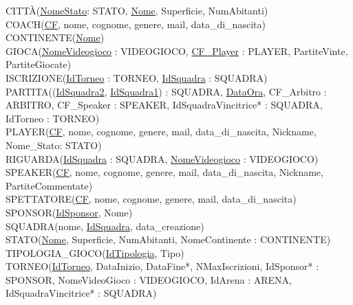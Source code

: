 \documentclass[a4paper,12pt]{report}
\begin{document}
\noindent CITTÀ(\underline{NomeStato}: STATO, \underline{Nome}, Superficie, NumAbitanti) \\

\noindent COACH(\underline{CF}, nome, cognome, genere, mail, data\_di\_nascita) \\

\noindent CONTINENTE(\underline{Nome}) \\

\noindent GIOCA(\underline{NomeVideogioco} : VIDEOGIOCO, \underline{CF\_Player} : PLAYER, PartiteVinte, PartiteGiocate) \\

\noindent ISCRIZIONE(\underline{IdTorneo} : TORNEO, \underline{IdSquadra} : SQUADRA) \\

\noindent PARTITA((\underline{IdSquadra2}, \underline{IdSquadra1}) : SQUADRA, \underline{DataOra}, CF\_Arbitro : ARBITRO, CF\_Speaker : SPEAKER, IdSquadraVincitrice* : SQUADRA, IdTorneo : TORNEO) \\

\noindent PLAYER(\underline{CF}, nome, cognome, genere, mail, data\_di\_nascita, Nickname, Nome\_Stato: STATO) \\

\noindent RIGUARDA(\underline{IdSquadra} : SQUADRA, \underline{NomeVideogioco} : VIDEOGIOCO) \\

\noindent SPEAKER(\underline{CF}, nome, cognome, genere, mail, data\_di\_nascita, Nickname, PartiteCommentate) \\

\noindent SPETTATORE(\underline{CF}, nome, cognome, genere, mail, data\_di\_nascita) \\

\noindent SPONSOR(\underline{IdSponsor}, Nome) \\

\noindent SQUADRA(nome, \underline{IdSquadra}, data\_creazione) \\

\noindent STATO(\underline{Nome}, Superficie, NumAbitanti, NomeContinente : CONTINENTE) \\

\noindent TIPOLOGIA\_GIOCO(\underline{IdTipologia}, Tipo) \\

\noindent TORNEO(\underline{IdTorneo}, DataInizio, DataFine*, NMaxIscrizioni, IdSponsor* : SPONSOR, NomeVideoGioco : VIDEOGIOCO, IdArena : ARENA, IdSquadraVincitrice* : SQUADRA) \\
\end{document}
